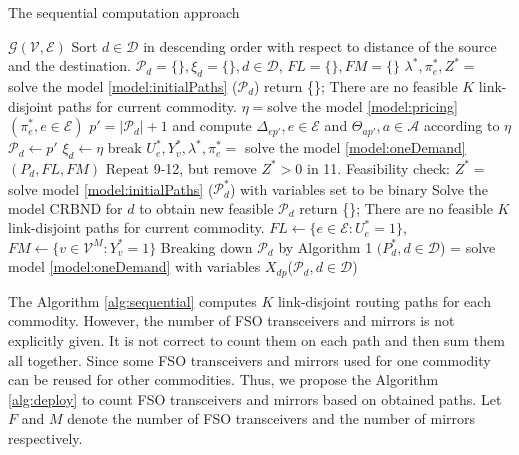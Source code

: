 \documentclass[onecolumn,11pt,draftclsnofoot]{IEEEtran}
\begin{document}
\begin{algorithm}
\caption{The sequential computation approach}
\label{alg:sequential}
\begin{algorithmic}[1]
\REQUIRE $\mathcal G(\mathcal V, \mathcal E)$
\STATE Sort $d \in \mathcal D$ in descending order with respect to distance of the source and the destination.
\STATE $\mathcal P_d = \{\}, \xi_d =\{\}, d \in \mathcal D$, $FL=\{\}, FM=\{\}$
         \STATE $\lambda^*, \pi_e^*, Z^* =$ solve the model \eqref{model:initialPaths} ($\mathcal P_d$)
             \STATE return \{\}; There are no feasible $K$ link-disjoint paths for current commodity.
         \ENDIF
         \STATE $\eta=$solve the model \eqref{model:pricing} $(\pi_e^*, e \in \mathcal E)$
         \STATE $p'=|\mathcal P_d|+1$ and compute $\Delta_{ep'}, e \in \mathcal E$ and $\Theta_{ap'}, a \in \mathcal A$ according to $\eta$
             \STATE $\mathcal P_d \leftarrow p'$
             \STATE $\xi_d \leftarrow \eta$
         \ELSE
             \STATE break
         \ENDIF
       \ENDWHILE
         \STATE $U_e^*, Y_v^*,\lambda^*, \pi_e^*=$ solve the model \eqref{model:oneDemand} $(P_d,FL,FM)$
         \STATE Repeat 9-12, but remove $Z^*>0$ in 11.
       \ENDWHILE
       \STATE Feasibility check: $Z^*=$ solve model \eqref{model:initialPaths} ($\mathcal P^*_d$) with variables set to be binary
       \STATE Solve the model CRBND for $d$ to obtain new feasible $\mathcal P_d$
       \STATE return \{\}; There are no feasible $K$ link-disjoint paths for current commodity.
       \ENDIF
       \ENDIF
       \STATE $FL \leftarrow \{e \in \mathcal E: U_e^* =1 \}$, $FM \leftarrow \{v \in \mathcal V^M: Y_v^* =1 \}$
       \STATE Breaking down $\mathcal P_d$ by Algorithm 1
    \ENDFOR
    \RETURN $\mathcal (P_d^*, d \in \mathcal D$) = solve model \eqref{model:oneDemand} with variables $X_{dp}$($\mathcal P_d, d \in \mathcal D$)
\end{algorithmic}
\end{algorithm}

The Algorithm \ref{alg:sequential} computes $K$ link-disjoint routing paths for each commodity. However, the number of FSO transceivers and mirrors is not explicitly given. It is not correct to count them on each path and then sum them all together. Since some FSO transceivers and mirrors used for one commodity can be reused for other commodities.
Thus, we propose the Algorithm \ref{alg:deploy} to count FSO transceivers and mirrors based on obtained paths. Let $F$ and $M$ denote the number of FSO transceivers and the number of mirrors respectively.
\end{document}
